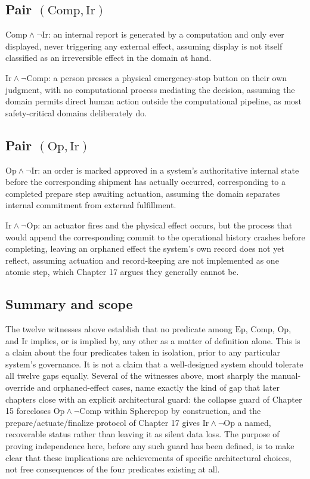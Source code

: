 \documentclass[11pt,openany]{book}
\begin{document}
\subsection{Pair \texorpdfstring{\((\mathrm{Comp},\mathrm{Ir})\)}{(Comp, Ir)}}

\(\mathrm{Comp}\land\neg\mathrm{Ir}\): an internal report is generated by a
computation and only ever displayed, never triggering any external effect,
assuming display is not itself classified as an irreversible effect in the
domain at hand.

\(\mathrm{Ir}\land\neg\mathrm{Comp}\): a person presses a physical
emergency-stop button on their own judgment, with no computational process
mediating the decision, assuming the domain permits direct human action
outside the computational pipeline, as most safety-critical domains
deliberately do.

\subsection{Pair \texorpdfstring{\((\mathrm{Op},\mathrm{Ir})\)}{(Op, Ir)}}

\(\mathrm{Op}\land\neg\mathrm{Ir}\): an order is marked approved in a
system's authoritative internal state before the corresponding shipment has
actually occurred, corresponding to a completed prepare step awaiting
actuation, assuming the domain separates internal commitment from external
fulfillment.

\(\mathrm{Ir}\land\neg\mathrm{Op}\): an actuator fires and the physical
effect occurs, but the process that would append the corresponding commit to
the operational history crashes before completing, leaving an orphaned effect
the system's own record does not yet reflect, assuming actuation and
record-keeping are not implemented as one atomic step, which Chapter 17 argues
they generally cannot be.

\subsection{Summary and scope}

The twelve witnesses above establish that no predicate among
\(\mathrm{Ep}\), \(\mathrm{Comp}\), \(\mathrm{Op}\), and
\(\mathrm{Ir}\) implies, or is implied by, any other as a matter of
definition alone. This is a claim about the four predicates taken in
isolation, prior to any particular system's governance. It is not a claim that
a well-designed system should tolerate all twelve gaps equally. Several of the
witnesses above, most sharply the manual-override and orphaned-effect cases,
name exactly the kind of gap that later chapters close with an explicit
architectural guard: the collapse guard of Chapter 15 forecloses
\(\mathrm{Op}\land\neg\mathrm{Comp}\) within Spherepop by construction, and
the prepare/actuate/finalize protocol of Chapter 17 gives
\(\mathrm{Ir}\land\neg\mathrm{Op}\) a named, recoverable status rather than
leaving it as silent data loss. The purpose of proving independence here,
before any such guard has been defined, is to make clear that these
implications are achievements of specific architectural choices, not free
consequences of the four predicates existing at all.
\end{document}
